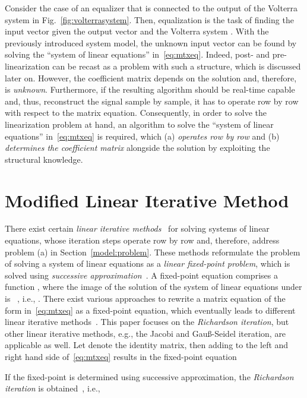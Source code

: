 \documentclass[10pt,twocolumn,twoside]{IEEEtran}
\begin{document}
Consider the case of an equalizer that is connected to the output of
the Volterra system  in Fig.~\ref{fig:volterrasystem}.
Then, equalization is the task of finding the input vector  given the
output vector  and the Volterra system . 
With the previously introduced system model, the unknown input vector
 can be found by solving the ``system of linear equations'' in~\eqref{eq:mtxeq}.
Indeed, post- and pre-linearization can be recast
as a problem with such a structure, which is discussed later on.
However, the coefficient matrix 
depends on the solution  and, therefore, is \emph{unknown}.
Furthermore, if the resulting algorithm should be real-time capable and, thus,
reconstruct the signal sample by sample, it has to operate row by row with
respect to the matrix equation. Consequently, in order to solve the linearization problem
at hand, an algorithm to solve the ``system of linear equations'' in~\eqref{eq:mtxeq}
is required, which (a) \emph{operates row by row} and
(b) \emph{determines the coefficient matrix}  alongside
the solution  by exploiting the structural knowledge.

\section{Modified Linear Iterative Method}
	\label{mlim}

There exist certain \emph{linear iterative methods}~\cite{kelley1995, isaacson1994, saad2003}
for solving systems of linear equations, whose iteration steps operate
row by row and, therefore, address problem (a) in Section~\ref{model:problem}.
These methods reformulate the problem of solving a system of linear
equations as a \emph{linear fixed-point problem}, which is solved using \emph{successive
approximation}~\cite{kelley1995}. A fixed-point equation comprises a function , where
the image of the solution  of the system of linear equations under 
is ~\cite{kelley1995}, i.e., .
There exist various approaches to rewrite a matrix equation of the form
in~\eqref{eq:mtxeq} as a fixed-point equation,
which eventually leads to different linear iterative methods~\cite{kelley1995,isaacson1994,saad2003}.
This paper focuses on the \emph{Richardson iteration},
but other linear iterative methods, e.g., the Jacobi and Gau\ss-Seidel iteration,
are applicable as well. Let  denote the identity matrix, then
adding  to the left and right hand side
of~\eqref{eq:mtxeq} results in the fixed-point equation

If the fixed-point  is determined using successive approximation,
the \emph{Richardson iteration} is obtained~\cite{kelley1995}, i.e.,
\end{document}
